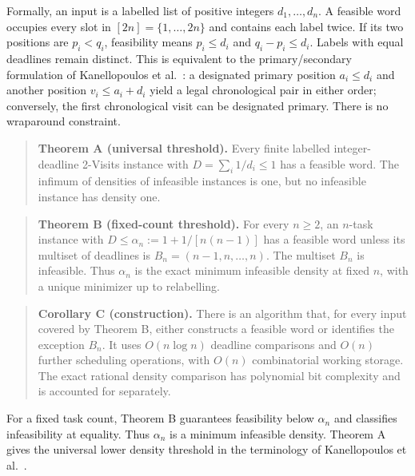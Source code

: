 \documentclass[11pt,a4paper]{article}
\begin{document}
Formally, an input is a labelled list of positive integers \(d_1,\ldots,d_n\). A feasible word occupies every slot in \([2n]=\{1,\ldots,2n\}\) and contains each label twice. If its two positions are \(p_i<q_i\), feasibility means \(p_i\le d_i\) and \(q_i-p_i\le d_i\). Labels with equal deadlines remain distinct. This is equivalent to the primary/secondary formulation of Kanellopoulos et al.~\cite{ref:KMPT26}: a designated primary position \(a_i\le d_i\) and another position \(v_i\le a_i+d_i\) yield a legal chronological pair in either order; conversely, the first chronological visit can be designated primary. There is no wraparound constraint.

\begin{quote}
\begin{minipage}{\linewidth}
\textbf{Theorem A (universal threshold).} Every finite labelled integer-deadline 2-Visits instance with \(D=\sum_i1/d_i\le1\) has a feasible word. The infimum of densities of infeasible instances is one, but no infeasible instance has density one.
\end{minipage}
\end{quote}

\begin{quote}
\begin{minipage}{\linewidth}
\textbf{Theorem B (fixed-count threshold).} For every \(n\ge2\), an \(n\)-task instance with \(D\le\alpha_n:=1+1/[n(n-1)]\) has a feasible word unless its multiset of deadlines is \(B_n=(n-1,n,\ldots,n)\). The multiset \(B_n\) is infeasible. Thus \(\alpha_n\) is the exact minimum infeasible density at fixed \(n\), with a unique minimizer up to relabelling.
\end{minipage}
\end{quote}

\begin{quote}
\begin{minipage}{\linewidth}
\textbf{Corollary C (construction).} There is an algorithm that, for every input covered by Theorem B, either constructs a feasible word or identifies the exception \(B_n\). It uses \(O(n\log n)\) deadline comparisons and \(O(n)\) further scheduling operations, with \(O(n)\) combinatorial working storage. The exact rational density comparison has polynomial bit complexity and is accounted for separately.
\end{minipage}
\end{quote}

For a fixed task count, Theorem B guarantees feasibility below \(\alpha_n\) and classifies infeasibility at equality. Thus \(\alpha_n\) is a minimum infeasible density. Theorem A gives the universal lower density threshold in the terminology of Kanellopoulos et al.~\cite{ref:KMPT26}.
\end{document}
